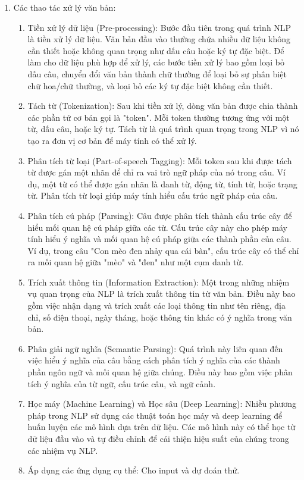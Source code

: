 \begin{enumerate}
\item Các thao tác xử lý văn bản:
\begin{enumerate}
    \item Tiền xử lý dữ liệu (Pre-processing): Bước đầu tiên trong quá trình NLP là tiền xử lý dữ liệu. Văn bản đầu vào thường chứa nhiều dữ liệu không cần thiết hoặc không quan trọng như dấu câu hoặc ký tự đặc biệt. Để làm cho dữ liệu phù hợp để xử lý, các bước tiền xử lý bao gồm loại bỏ dấu câu, chuyển đổi văn bản thành chữ thường để loại bỏ sự phân biệt chữ hoa/chữ thường, và loại bỏ các ký tự đặc biệt không cần thiết.
    \item Tách từ (Tokenization): Sau khi tiền xử lý, dòng văn bản được chia thành các phần tử cơ bản gọi là "token". Mỗi token thường tương ứng với một từ, dấu câu, hoặc ký tự. Tách từ là quá trình quan trọng trong NLP vì nó tạo ra đơn vị cơ bản để máy tính có thể xử lý.
    \item Phân tích từ loại (Part-of-speech Tagging): Mỗi token sau khi được tách từ được gán một nhãn để chỉ ra vai trò ngữ pháp của nó trong câu. Ví dụ, một từ có thể được gán nhãn là danh từ, động từ, tính từ, hoặc trạng từ. Phân tích từ loại giúp máy tính hiểu cấu trúc ngữ pháp của câu.
    \item Phân tích cú pháp (Parsing): Câu được phân tích thành cấu trúc cây để hiểu mối quan hệ cú pháp giữa các từ. Cấu trúc cây này cho phép máy tính hiểu ý nghĩa và mối quan hệ cú pháp giữa các thành phần của câu. Ví dụ, trong câu "Con mèo đen nhảy qua cái bàn", cấu trúc cây có thể chỉ ra mối quan hệ giữa "mèo" và "đen" như một cụm danh từ.
    \item Trích xuất thông tin (Information Extraction): Một trong những nhiệm vụ quan trọng của NLP là trích xuất thông tin từ văn bản. Điều này bao gồm việc nhận dạng và trích xuất các loại thông tin như tên riêng, địa chỉ, số điện thoại, ngày tháng, hoặc thông tin khác có ý nghĩa trong văn bản.
    \item Phân giải ngữ nghĩa (Semantic Parsing): Quá trình này liên quan đến việc hiểu ý nghĩa của câu bằng cách phân tích ý nghĩa của các thành phần ngôn ngữ và mối quan hệ giữa chúng. Điều này bao gồm việc phân tích ý nghĩa của từ ngữ, cấu trúc câu, và ngữ cảnh.
    \item Học máy (Machine Learning) và Học sâu (Deep Learning): Nhiều phương pháp trong NLP sử dụng các thuật toán học máy và deep learning để huấn luyện các mô hình dựa trên dữ liệu. Các mô hình này có thể học từ dữ liệu đầu vào và tự điều chỉnh để cải thiện hiệu suất của chúng trong các nhiệm vụ NLP.
    \item Áp dụng các ứng dụng cụ thể: Cho input và dự đoán thử.
\end{enumerate}

\end{enumerate}

